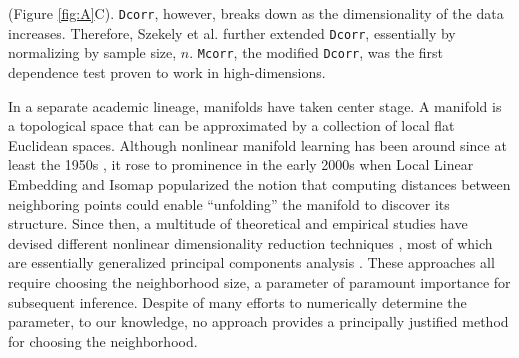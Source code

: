 \documentclass[11pt]{article}
\newcommand{\note}[2][]{\added[#1,remark={#2}]{}}
\providecommand{\sct}[1]{{\sc \texttt{#1}}}
\providecommand{\mb}[1]{\boldsymbol{#1}}
\newcommand{\Dcorr}{\sct{Dcorr}}
\newcommand{\Mcorr}{\sct{Mcorr}}
\newcommand{\jovo}[1]{{\note{jv: #1}}}
\newcommand{\cs}[1]{{\note{cs: #1}}}
\newcommand{\mbx}{\ensuremath{\mb{x}}}
\newcommand{\mby}{\ensuremath{\mb{y}}}
\begin{document}
(Figure \ref{fig:A}C). 
\Dcorr, however, breaks down as the dimensionality of the data increases.  Therefore, Szekely et al. \cite{SzekelyRizzo2013a} further extended \Dcorr, essentially by normalizing by sample size,  $n$. 
\Mcorr, the modified \Dcorr, was the first dependence test proven to work in high-dimensions.

In a separate academic lineage, manifolds have taken center stage.  A manifold is a topological space that can be approximated by a collection of local flat Euclidean spaces.  Although nonlinear manifold learning has been around since at least the 1950s \cite{TorgersonBook}, it rose to prominence in the early 2000s when Local Linear Embedding \cite{SaulRoweis2000} and Isomap \cite{TenenbaumSilvaLangford2000} popularized the notion that computing distances between neighboring points could enable ``unfolding'' the manifold to discover its structure.  Since then, a multitude of theoretical and empirical studies have devised different nonlinear dimensionality reduction techniques \cite{LeeVerleysen2007}, most of which are essentially generalized principal components analysis \cite{ScholkopfSmolaMuller1999}.  These approaches all require choosing the neighborhood size, a parameter of paramount importance for subsequent inference. Despite of many efforts to numerically determine the parameter, to our knowledge, no approach provides a principally justified method for choosing the neighborhood. 
\end{document}
